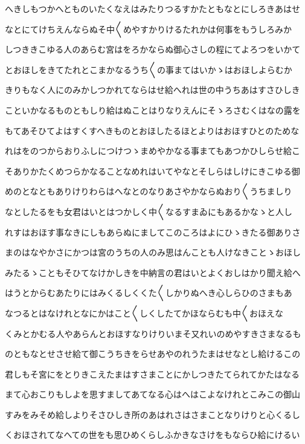 \documentclass[a4paper,11pt,landscape]{ltjtarticle}
\begin{document}
へきしもつかへとものいたくなえはみたりつるすかたともなとにしろきあはせ
\par\medskip
なとにてけちえんならぬそ中〱めやすかりけるたれかは何事をもうしろみか
\par\medskip
しつききこゆる人のあらむ宮はをろかならぬ御心さしの程にてよろつをいかて
\par\medskip
とおほしをきてたれとこまかなるうち〱の事まてはいかゝはおほしよらむか
\par\medskip
きりもなく人にのみかしつかれてならはせ給へれは世の中うちあはすさひしき
\par\medskip
こといかなるものともしり給はぬことはりなりえんにそゝろさむくはなの露を
\par\medskip
もてあそひてよはすくすへきものとおほしたるほとよりはおほすひとのためな
\par\medskip
れはをのつからおりふしにつけつゝまめやかなる事まてもあつかひしらせ給こ
\par\medskip
そありかたくめつらかなることなめれはいてやなとそしらはしけにきこゆる御
\par\medskip
めのとなともありけりわらはへなとのなりあさやかならぬおり〱うちましり
\par\medskip
なとしたるをも女君はいとはつかしく中〱なるすまゐにもあるかなゝと人し
\par\medskip
れすはおほす事なきにしもあらぬにましてこのころはよにひゝきたる御ありさ
\par\medskip
まのはなやかさにかつは宮のうちの人のみ思はんことも人けなきことゝおほし
\par\medskip
みたるゝこともそひてなけかしきを中納言の君はいとよくおしはかり聞え給へ
\par\medskip
はうとからむあたりにはみくるしくくた〱しかりぬへき心しらひのさまもあ
\par\medskip
なつるとはなけれとなにかはこと〱しくしたてかほならむも中〱おほえな
\par\medskip
くみとかむる人やあらんとおほすなりけりいまそ又れいのめやすきさまなるも
\par\medskip
のともなとせさせ給て御こうちきをらせあやのれうたまはせなとし給けるこの
\par\medskip
君しもそ宮にをとりきこえたまはすさまことにかしつきたてられてかたはなる
\par\medskip
まて心おこりもしよを思すましてあてなる心はへはこよなけれとこみこの御山
\par\medskip
すみをみそめ給しよりそさひしき所のあはれさはさまことなりけりと心くるし
\par\medskip
くおほされてなへての世をも思ひめくらしふかきなさけをもならひ給にけるい
\end{document}
